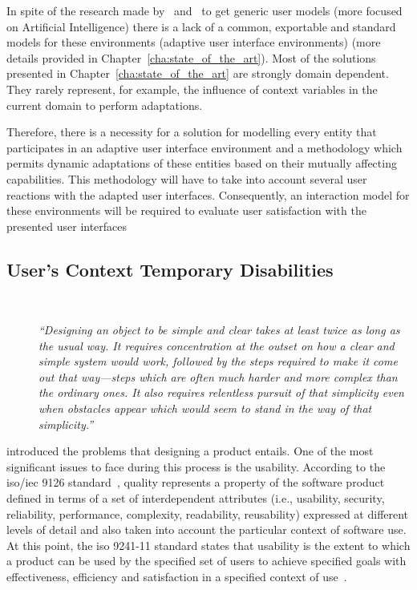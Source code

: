 In spite of the research made by~\citet{kobsa_generic_2001}
and~\citet{fink_review_2000} to get generic user models (more focused on 
Artificial Intelligence) there is a lack of a common, exportable and standard 
models for these environments (adaptive user interface environments) (more 
details provided in Chapter~\ref{cha:state_of_the_art}). Most of the solutions 
presented in Chapter~\ref{cha:state_of_the_art} are strongly domain dependent. 
They rarely represent, for example, the influence of context variables in 
the current domain to perform adaptations. 

Therefore, there is a necessity for a solution for modelling every entity that
participates in an adaptive user interface environment and a methodology which
permits dynamic adaptations of these entities based on their mutually affecting
capabilities. This methodology will have to take into account several user
reactions with the adapted user interfaces. Consequently, an interaction model
for these environments will be required to evaluate user satisfaction with the
presented user interfaces


\subsection{User's Context Temporary Disabilities}
\label{sec:context_disabilities}

\begin{description}
  \item[] \hfill \\
  \begin{mdframed}[hidealllines=true,backgroundcolor=gray!20]
  \textit{``Designing an object to be simple and clear takes at least twice as long as 
  the usual way. It requires concentration at the outset on how a clear and 
  simple system would work, followed by the steps required to make it come out 
  that way—steps which are often much harder and more complex than the ordinary 
  ones. It also requires relentless pursuit of that simplicity even when obstacles 
  appear which would seem to stand in the way of that simplicity.'' }
  \end{mdframed}
\end{description}  
  
\citeauthor{nelson1977home} introduced the problems that designing 
a product entails. One of the most significant issues to face during this process 
is the usability. According to the \acs{iso}/\acs{iec} 9126 standard~\citep{isoiec1}, 
quality represents a property of the software product defined in terms of a set 
of interdependent attributes (i.e., usability, security, reliability, performance, 
complexity, readability, reusability) expressed at different levels of detail 
and also taken into account the particular context of software use. At this 
point, the \acs{iso} 9241-11 standard states that usability is the extent to 
which a product can be used by the specified set of users to achieve specified 
goals with effectiveness, efficiency and satisfaction in a specified context of 
use~\citep{iso9241}.


